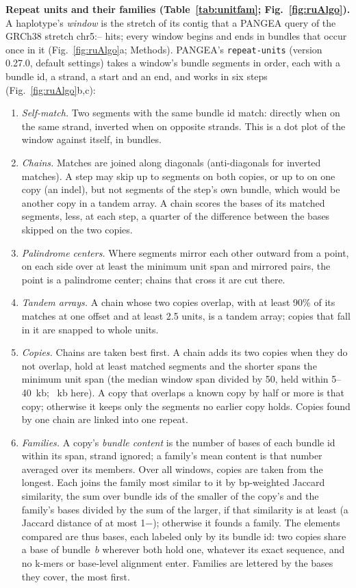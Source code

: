\textbf{Repeat units and their families (Table~\ref{tab:unitfam}; Fig.~\ref{fig:ruAlgo}).} A haplotype's \emph{window}
is the stretch of its contig that a PANGEA query of the GRCh38 stretch chr5:\wfGStart--\wfGEnd{} hits; every window
begins and ends in bundles that occur once in it (Fig.~\ref{fig:ruAlgo}a; Methods). PANGEA's \texttt{repeat-units}
(version 0.27.0, default settings) takes a window's bundle segments in order, each with a bundle id, a strand, a start and
an end, and works in six steps (Fig.~\ref{fig:ruAlgo}b,c):
\begin{enumerate}
\item \emph{Self-match.} Two segments with the same bundle id match: directly when on the same strand, inverted when on
opposite strands. This is a dot plot of the window against itself, in bundles.
\item \emph{Chains.} Matches are joined along diagonals (anti-diagonals for inverted matches). A step may skip up to
\ufMaxGap{} segments on both copies, or up to \ufMaxIndel{} on one copy (an indel), but not segments of the step's own
bundle, which would be another copy in a tandem array. A chain scores the bases of its matched segments, less, at each
step, a quarter of the difference between the bases skipped on the two copies.
\item \emph{Palindrome centers.} Where segments mirror each other outward from a point, on each side over at least the
minimum unit span and \ufMinMatch{} mirrored pairs, the point is a palindrome center; chains that cross it are cut there.
\item \emph{Tandem arrays.} A chain whose two copies overlap, with at least 90\% of its matches at one offset and at
least 2.5 units, is a tandem array; copies that fall in it are snapped to whole units.
\item \emph{Copies.} Chains are taken best first. A chain adds its two copies when they do not overlap, hold at least
\ufMinMatch{} matched segments and the shorter spans the minimum unit span (the median window span divided by 50, held
within 5--40~kb; \ufAutoKb{}~kb here). A copy that overlaps a known copy by half or more is that copy; otherwise it keeps
only the segments no earlier copy holds. Copies found by one chain are linked into one repeat.
\item \emph{Families.} A copy's \emph{bundle content} is the number of bases of each bundle id within its span, strand
ignored; a family's mean content is that number averaged over its members. Over all windows, copies are taken from the
longest. Each joins the family most similar to it by bp-weighted Jaccard similarity, the sum over bundle ids of the
smaller of the copy's and the family's bases divided by the sum of the larger, if that similarity is at least \ufJac{}
(a Jaccard distance of at most 1$-$\ufJac); otherwise it founds a family. The elements compared are thus bases, each labeled only by its bundle id: two copies share a base of bundle~$b$ wherever both hold one, whatever its exact sequence, and no k-mers or base-level alignment enter. Families are lettered by the bases they
cover, the most first.
\end{enumerate}
